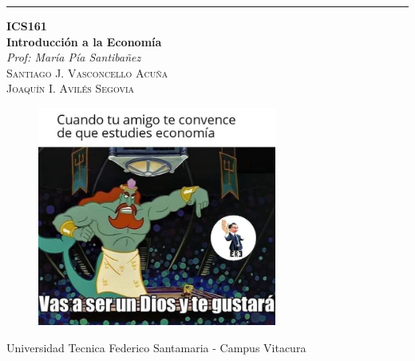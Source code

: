 
\begin{titlepage} %

	\raggedleft %

	\rule{1pt}{\textheight} %
	\hspace{0.05\textwidth} %
	\parbox[b]{0.75\textwidth}{ %

	{\Huge\bfseries ICS161 \\[0.5\baselineskip] Introducción a la Economía}\\[2\baselineskip] %
	{\large\textit{Prof: María Pía Santibañez}}\\[4\baselineskip] %
	{\Large\textsc{Santiago J. Vasconcello Acuña}}\\[4\baselineskip] %
	{\Large\textsc{Joaquín I. Avilés Segovia}}\\[4\baselineskip] %
\begin{figure} %
	\centering
	\includegraphics[width=0.7\textwidth]{images/meme2.jpg}
\end{figure}
	\vspace{0.5\textheight} %

	{\noindent Universidad Tecnica Federico Santamaria - Campus Vitacura}\\[\baselineskip] %
	}


\end{titlepage}

